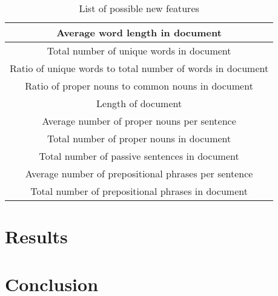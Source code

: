 \documentclass[]{article}
\begin{document}
\begin{table}[!htbp]
	\begin{center}
		\begin{tabular}{| c |} \hline
			Average word length in document \\ \hline
			Total number of unique words in document\\ \hline
			Ratio of unique words to total number of words in document \\ \hline
			Ratio of proper nouns to common nouns in document \\ \hline
			Length of document \\ \hline
			Average number of proper nouns per sentence \\ \hline
			Total number of proper nouns in document \\ \hline
			Total number of passive sentences in document \\ \hline
			Average number of prepositional phrases per sentence \\ \hline
			Total number of prepositional phrases in document \\ \hline
			
		\end{tabular}
	\end{center}
	\caption{List of possible new features}
	\label{table:features2}
\end{table}

\section{Results}

\section{Conclusion}


\printbibliography
\end{document}

